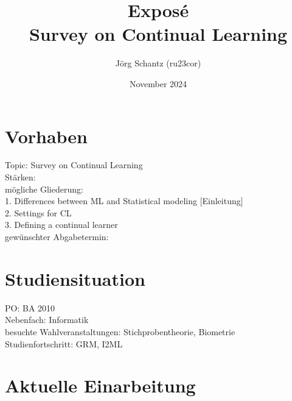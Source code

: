 \documentclass[11pt,a4paper]{report}
\title{Exposé\\
	\Large{Survey on Continual Learning}}
\author{Jörg Schantz (ru23cor)}
\date{November 2024}
\begin{document}
	\maketitle
\chapter*{Vorhaben}
	Topic: Survey on Continual Learning\\
	Stärken: \\
	mögliche Gliederung:\\
	1. Differences between ML and Statistical modeling [Einleitung] \\
	2. Settings for CL \\
	3. Defining a continual learner\\
	gewünschter Abgabetermin:\\
\chapter*{Studiensituation}
	PO: BA 2010\\
	Nebenfach: Informatik\\
	besuchte Wahlveranstaltungen: Stichprobentheorie, Biometrie\\
	Studienfortschritt: GRM, I2ML\\
\chapter*{Aktuelle Einarbeitung}
	
\end{document}
